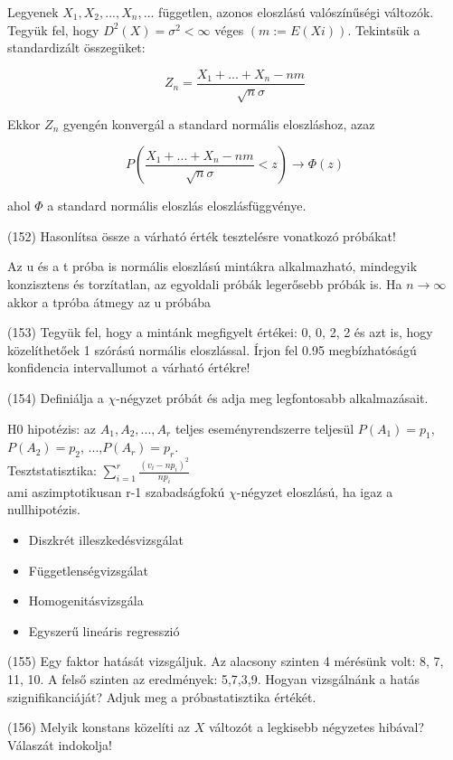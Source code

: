 \documentclass[12p]{article}
\begin{document}
Legyenek $X_1 , X_2 ,..., X_n ,...$ független, azonos eloszlású valószínűségi változók. Tegyük fel, hogy $D^2(X) = \sigma^2 < \infty$ véges $(m:=E(Xi))$. Tekintsük a standardizált összegüket:

$$Z_n = \frac{X_1 + ... + X_n -nm}{\sqrt{n}\sigma}$$

Ekkor $Z_n$ gyengén konvergál a standard normális eloszláshoz,
azaz

$$P(\frac{X_1 + ... + X_n - nm}{\sqrt{n}\sigma} < z) \rightarrow \Phi(z)$$

ahol $\Phi$ a standard normális eloszlás eloszlásfüggvénye.

(152) Hasonlítsa össze a várható érték tesztelésre vonatkozó próbákat!

Az u és a t próba is normális eloszlású mintákra alkalmazható, mindegyik konzisztens és torzítatlan, az egyoldali próbák legerősebb próbák is. Ha $n \rightarrow \infty$ akkor a tpróba átmegy az u próbába

(153) Tegyük fel, hogy a mintánk megfigyelt értékei: 0, 0, 2, 2 és azt is, hogy közelíthetőek 1 szórású normális eloszlással. Írjon fel 0.95 megbízhatóságú konfidencia intervallumot a várható értékre!

(154) Definiálja a $\chi$-négyzet próbát és adja meg legfontosabb alkalmazásait.

H0 hipotézis: az $A_1, A_2, ..., A_r$ teljes eseményrendszerre teljesül $P(A_1)=p_1$, $P(A_2)=p_2$, ...,$P(A_r)=p_r$.\\
Tesztstatisztika: $\displaystyle{ \sum^r_{i=1} \frac{(v_i - np_i)^2}{np_i}}$\\
ami aszimptotikusan r-1 szabadságfokú $\chi$-négyzet eloszlású, ha igaz a nullhipotézis. 

\begin{itemize}
	\item Diszkrét illeszkedésvizsgálat
	\item Függetlenségvizsgálat
	\item Homogenitásvizsgála
	\item Egyszerű lineáris regresszió
\end{itemize}

(155) Egy faktor hatását vizsgáljuk. Az alacsony szinten 4 mérésünk volt: 8, 7, 11, 10. A felső
szinten az eredmények: 5,7,3,9. Hogyan vizsgálnánk a hatás szignifikanciáját? Adjuk meg
a próbastatisztika értékét.

(156) Melyik konstans közelíti az $X$ változót a legkisebb négyzetes hibával? Válaszát indokolja!
\end{document}
